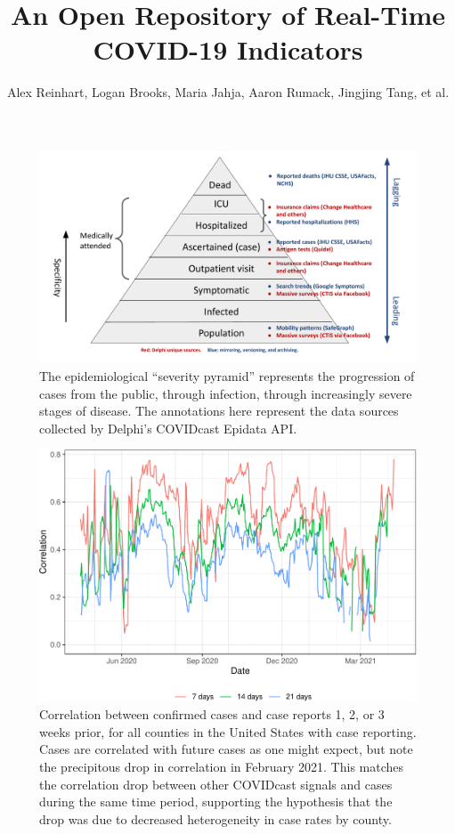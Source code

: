 \documentclass[9pt,twoside,lineno]{pnas-new}
\title{An Open Repository of Real-Time COVID-19 Indicators}
\author{Alex Reinhart, Logan Brooks, Maria Jahja, Aaron Rumack, Jingjing Tang,
  et al.}
\begin{document}
\maketitle

\begin{figure}
\includegraphics[width=\textwidth]{fig/severity-pyramid.pdf}
\caption{The epidemiological ``severity pyramid'' represents the progression of
cases from the public, through infection, through increasingly severe stages of
disease. The annotations here represent the data sources collected by Delphi's
COVIDcast Epidata API.}
\end{figure}

\clearpage

\begin{figure}

{\centering \includegraphics[width=\textwidth]{fig/case-correlation-lagged-plot-1} 

}

\caption{Correlation between confirmed cases and case reports 1, 2, or 3 weeks prior, for all counties in the United States with case reporting. Cases are correlated with future cases as one might expect, but note the precipitous drop in correlation in February 2021. This matches the correlation drop between other COVIDcast signals and cases during the same time period, supporting the hypothesis that the drop was due to decreased heterogeneity in case rates by county.}\label{fig:case-correlation-lagged-plot}
\end{figure}
\end{document}
